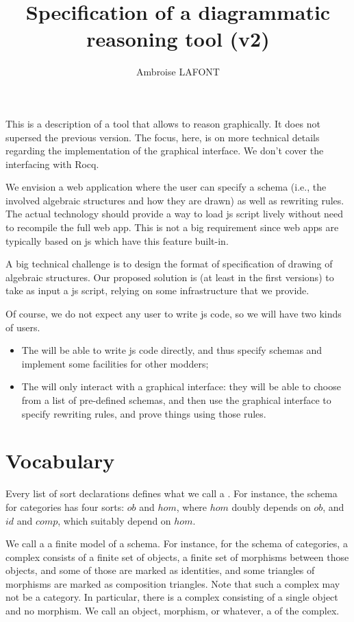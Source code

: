 \documentclass{article}
\title{Specification of a diagrammatic reasoning tool (v2)}
\author{Ambroise LAFONT}
\begin{document}
\maketitle{}
This is a description of a tool that allows to reason graphically. 
It does not supersed the previous version. The focus, here, is on more technical details regarding the implementation of the graphical interface. We don't cover the interfacing with Rocq.

We envision a web application where the user can 
specify a schema (i.e., the involved algebraic structures and how they are drawn)
as well as rewriting rules. The actual technology should provide a way to load js script lively without need to recompile the full web app. This is not a big requirement since web apps are typically based on js which have this feature built-in.

A big technical challenge is to design the format of specification of drawing of algebraic structures.
Our proposed solution is (at least in the first versions) to take as input a js script, relying on some infrastructure that we provide.

Of course, we do not expect any user to write js code, so we will have two kinds of users.
\begin{itemize}
    \item The \AP{} will be able to write js code directly, and thus specify schemas and implement some facilities for other modders;
    \item The \AP{} will only interact with a graphical interface: they will be able to choose from a list of pre-defined schemas, and then use the graphical interface to specify rewriting rules, and prove things using those rules.   
\end{itemize}

\section{Vocabulary}

Every list of sort declarations defines what we call a \AP{}. For instance, the schema for categories has four sorts: $ob$ and $hom$, where $hom$ doubly depends on $ob$, and $id$ and $comp$, which suitably depend on $hom$.

We call a \AP{} a finite model of a schema. For instance, for the schema of categories, a complex consists of a finite set of objects, a finite set of morphisms between those objects, and some of those are marked as identities, and some triangles of morphisms are marked as composition triangles. Note that such a complex may not be a category. In particular, there is a complex consisting of a single object and no morphism. We call an object, morphism, or whatever, a \AP{} of the complex.
\end{document}
